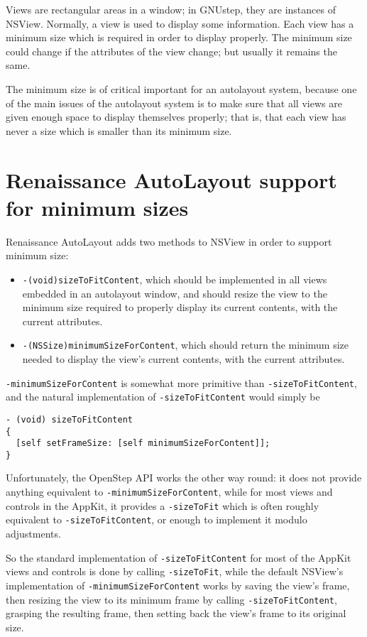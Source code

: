 Views are rectangular areas in a window; in GNUstep, they are
instances of NSView.  Normally, a view is used to display some
information.  Each view has a minimum size which is required in order
to display properly.  The minimum size could change if the attributes
of the view change; but usually it remains the same.

The minimum size is of critical important for an autolayout system,
because one of the main issues of the autolayout system is to make
sure that all views are given enough space to display themselves
properly; that is, that each view has never a size which is smaller
than its minimum size.

\section{Renaissance AutoLayout support for minimum sizes}

Renaissance AutoLayout adds two methods to NSView in order to support
minimum size:

\begin{itemize}
\item \texttt{-(void)sizeToFitContent}, which should be 
implemented in all views embedded in an autolayout window, and should
resize the view to the minimum size required to properly display its
current contents, with the current attributes.
\item \texttt{-(NSSize)minimumSizeForContent}, which should return the 
minimum size needed to display the view's current contents, with the
current attributes.
\end{itemize}

\texttt{-minimumSizeForContent} is somewhat more primitive than 
\texttt{-sizeToFitContent}, and the natural implementation of 
\texttt{-sizeToFitContent} would simply be
\begin{verbatim}
- (void) sizeToFitContent
{
  [self setFrameSize: [self minimumSizeForContent]];
}
\end{verbatim}

Unfortunately, the OpenStep API works the other way round: it does not
provide anything equivalent to \texttt{-minimumSizeForContent}, while
for most views and controls in the AppKit, it provides a
\texttt{-sizeToFit} which is often roughly equivalent to 
\texttt{-sizeToFitContent}, or enough to implement it modulo adjustments.

So the standard implementation of \texttt{-sizeToFitContent} for most
of the AppKit views and controls is done by calling
\texttt{-sizeToFit}, while the default NSView's implementation of
\texttt{-minimumSizeForContent} works by saving the view's frame, then
resizing the view to its minimum frame by calling
\texttt{-sizeToFitContent}, grasping the resulting frame, then setting 
back the view's frame to its original size.

